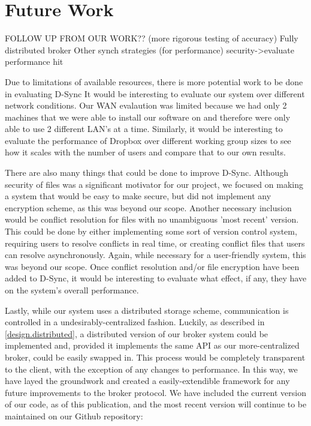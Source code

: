 \section{Future Work}
\label{discussion}
FOLLOW UP FROM OUR WORK??
(more rigorous testing of accuracy)
Fully distributed broker
Other synch strategies (for performance)
security->evaluate performance hit

Due to limitations of available resources, there is 
more potential work to be done in evaluating D-Sync
It would be interesting to evaluate our system over different
network conditions. Our WAN evalaution was limited because
we had only 2 machines that we were able to install our 
software on and therefore were only able to use 2 different
LAN's at a time. Similarly, it would be interesting to 
evaluate the performance of Dropbox over different
working group sizes to see how it scales with the number 
of users and compare that to our own results.

There are also many things that could be done to improve D-Sync.
Although security of files was a significant motivator for our
project, we focused on making a system that would be easy to 
make secure, but did not implement any encryption scheme, 
as this was beyond our scope. Another necessary inclusion would
be conflict resolution for files with no unambiguous 'most recent'
version. This could be done by either implementing some sort of
version control system, requiring users to resolve conflicts in
real time, or creating conflict files that users can resolve
asynchronously. Again, while necessary for a user-friendly 
system, this was beyond our scope. Once conflict resolution and/or
file encryption have been added to D-Sync, it would be 
interesting to evaluate what effect, if any, they have on 
the system's overall performance.

Lastly, while our system uses a distributed storage scheme,
communication is controlled in a undesirably-centralized fashion.
Luckily, as described in \ref{design.distributed}, a distributed
version of our broker system could be implemented and, provided 
it implements the same API as our more-centralized broker, could
be easily swapped in. This process would be completely transparent
to the client, with the exception of any changes to performance.
In this way, we have layed the groundwork and created a easily-extendible
framework for any future improvements to the broker protocol. We have
included the current version of our code, as of this publication, and
the most recent version will continue to be maintained on our
Github repository: 
